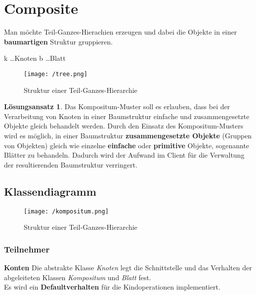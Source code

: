 \documentclass[12pt,a4paper,titlepage]{article}
\theoremstyle{definition}
\newtheorem*{definition*}{Lösungsansatz}
\begin{document}
\newpage

\section{Composite}
Man möchte Teil-Ganzes-Hierachien erzeugen und dabei die Objekte in einer \textbf{baumartigen} Struktur gruppieren.
\newline

k \ldots Knoten
\newline
b \ldots Blatt

\begin{figure}[htbp]
	\begin{center}
	\texttt{[image: /tree.png]}
	
	\caption{Struktur einer Teil-Ganzes-Hierarchie}
	\label{default}
	\end{center}
\end{figure}

\begin{definition*}
Das Kompositum-Muster soll es erlauben, dass bei der Verarbeitung von Knoten in einer Baumstruktur einfache und zusammengesetzte Objekte gleich behandelt werden.
\newline
Durch den Einsatz des Kompositum-Musters wird es möglich, in einer Baumstruktur \textbf{zusammengesetzte Objekte} (Gruppen von Objekten) gleich wie einzelne \textbf{einfache} oder \textbf{primitive} Objekte, sogenannte Blätter zu behandeln. Dadurch wird der Aufwand im Client für die Verwaltung der resultierenden Baumstruktur verringert.
\end{definition*}

\subsection{Klassendiagramm}
\begin{figure}[htbp]
	\begin{center}
	\texttt{[image: /kompositum.png]}
	
	\caption{Struktur einer Teil-Ganzes-Hierarchie}
	\label{default}
	\end{center}
\end{figure}

\subsubsection{Teilnehmer}
\textbf{Konten} 
\newline
Die abstrakte Klasse \textit{Knoten} legt die Schnittstelle und das Verhalten der abgeleiteten Klassen \textit{Kompositum} und \textit{Blatt} fest. \\
Es wird ein \textbf{Defaultverhalten} für die Kindoperationen implementiert.
\newline
\end{document}
